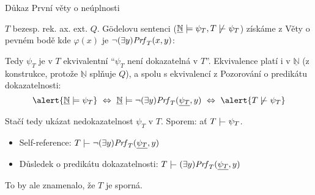 \documentclass{beamer}
\begin{document}
\begin{frame}{Důkaz První věty o neúplnosti}

    $T$ bezesp. rek. ax. ext. $Q$. Gödelovu sentenci ($\underline{\mathbb N}\models\psi_T,T\not\proves\psi_T$) získáme z Věty o pevném bodě kde $\varphi(x)$ je \alert{$\neg(\exists y)\mathit{Prf}_T(x,y)$}:


    Tedy $\psi_T$ je v $T$ ekvivalentní ``$\psi_T$ není dokazatelná v $T$''. Ekvivalence platí i v $\underline{\mathbb N}$ (z konstrukce, protože $\underline{\mathbb N}$ splňuje $Q$), a spolu s ekvivalencí z Pozorování o predikátu dokazatelnosti:    
    $$
    \alert{\underline{\mathbb N}\models\psi_T}\ \Leftrightarrow\ 
    \underline{\mathbb N}\models\neg(\exists y)\Prf_T(\underline{\psi_T},y)\ \Leftrightarrow\ \alert{T\not\proves\psi_T}
    $$    

    Stačí tedy ukázat nedokazatelnost $\psi_T$ v $T$. \alert{Sporem: ať $T\proves\psi_T$. }
    
    \begin{itemize}
        \item Self-reference: $T\proves\neg(\exists y)\Prf_T(\underline{\psi_T},y)$
        \item Důsledek o predikátu dokazatelnosti: $T\proves (\exists y)\Prf_T(\underline{\psi_T},y)$
    \end{itemize}
    To by ale znamenalo, že $T$ je sporná.\hfill\qedsymbol
    
\end{frame}
\end{document}
